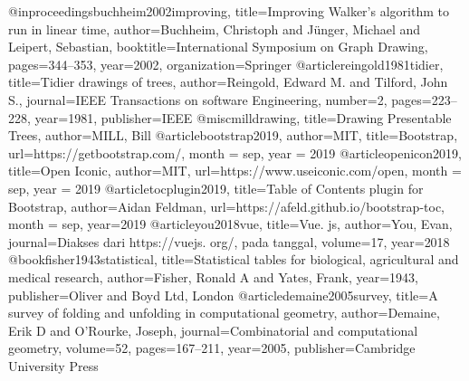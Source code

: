   @inproceedings{buchheim2002improving,
    title={Improving Walker’s algorithm to run in linear time},
    author={Buchheim, Christoph and J{\"u}nger, Michael and Leipert, Sebastian},
    booktitle={International Symposium on Graph Drawing},
    pages={344--353},
    year={2002},
    organization={Springer}
  }
  @article{reingold1981tidier,
    title={Tidier drawings of trees},
    author={Reingold, Edward M. and Tilford, John S.},
    journal={IEEE Transactions on software Engineering},
    number={2},
    pages={223--228},
    year={1981},
    publisher={IEEE}
  }
  @misc{milldrawing,
    title={Drawing Presentable Trees},
    author={MILL, Bill}
  }
  @article{bootstrap2019,
    author={MIT},
    title={Bootstrap},
    url={https://getbootstrap.com/},
    month = sep,
    year = {2019}
  }
  @article{openicon2019,
    title={Open Iconic},
    author={MIT},
    url={https://www.useiconic.com/open},
    month = sep,
    year = {2019}
  }
  @article{tocplugin2019,
    title={Table of Contents plugin for Bootstrap},
    author={Aidan Feldman},
    url={https://afeld.github.io/bootstrap-toc},
    month = sep,
    year={2019}
  }
  @article{you2018vue,
    title={Vue. js},
    author={You, Evan},
    journal={Diakses dari https://vuejs. org/, pada tanggal},
    volume={17},
    year={2018}
  }
  @book{fisher1943statistical,
    title={Statistical tables for biological, agricultural and medical research},
    author={Fisher, Ronald A and Yates, Frank},
    year={1943},
    publisher={Oliver and Boyd Ltd, London}
  }
  @article{demaine2005survey,
    title={A survey of folding and unfolding in computational geometry},
    author={Demaine, Erik D and O’Rourke, Joseph},
    journal={Combinatorial and computational geometry},
    volume={52},
    pages={167--211},
    year={2005},
    publisher={Cambridge University Press}
  }
